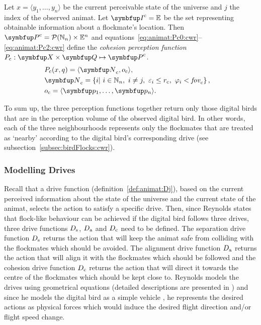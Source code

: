 \begin{definition}
	\label{def:animat:Pc:cwr}
	Let $x=\langle y_1,\ldots,y_n \rangle$ be the current perceivable state of the universe and $j$ the index of the observed animat. Let $\set{I}^\textnormal{c}=\E$ be the set representing obtainable information about a flockmate's location. Then $\set{P}^\textnormal{c}=\powset{\N_n} \times \E^n$ and equations~\eqref{eq:animat:Pc0:cwr}--\eqref{eq:animat:Pc2:cwr} define the \emph{cohesion perception function} $P_\textnormal{c}: \set{X} \times \set{Q} \mapsto \set{P}^\textnormal{c}$.
	\begin{eqnarray}
		& P_\textnormal{c}(x,q)=\langle\set{N}_\textnormal{c},o_\textnormal{c}\rangle, & \label{eq:animat:Pc0:cwr} \\
		& \set{N}_\textnormal{c}=\left\{i|\ i \in \N_n,\ i \neq j,\ \varepsilon_i%
		 \leq r_\textnormal{c},\ \varphi_i%
		 < \fov_\textnormal{c}\right\}, & \\
		& o_\textnormal{c}=\langle \vect{p}_1,\ldots,\vect{p}_n\rangle. & \label{eq:animat:Pc2:cwr}
	\end{eqnarray}
\end{definition}

To sum up, the three perception functions together return only those digital birds that are in the perception volume of the observed digital bird. In other words, each of the three neighbourhoods represents only the flockmates that are treated as `nearby' according to the digital bird's corresponding drive \cite{reynolds:1987} (see subsection~\ref{subsec:birdFlocks:cwr}).

\subsubsection{Modelling Drives}
Recall that a drive function (definition~\ref{def:animat:Dj}), based on the current perceived information about the state of the universe and the current state of the animat, selects the action to satisfy a specific drive. Then, since Reynolds states that flock-like behaviour can be achieved if the digital bird follows three drives, three drive functions $D_\textnormal{s}$, $D_\textnormal{a}$ and $D_\textnormal{c}$ need to be defined. The separation drive function $D_\textnormal{s}$ returns the action that will keep the animat safe from colliding with the flockmates which should be avoided. The alignment drive function $D_\textnormal{a}$ returns the action that will align it with the flockmates which should be followed and the cohesion drive function $D_\textnormal{c}$ returns the action that will direct it towards the centre of the flockmates which should be kept close to. Reynolds models the drives using geometrical equations (detailed descriptions are presented in \cite{reynolds:1999}) and since he models the digital bird as a simple vehicle \cite{reynolds:1987,reynolds:1999}, he represents the desired actions as physical forces which would induce the desired flight direction and/or flight speed change.  

